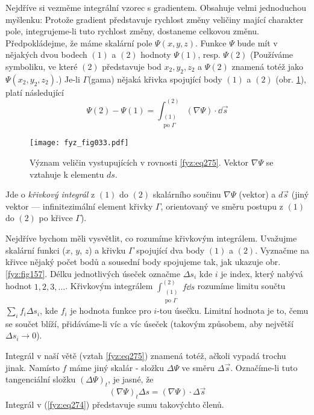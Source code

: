     Nejdříve si vezměme integrální vzorec s gradientem. Obsahuje velmi jednoduchou myšlenku: 
    Protože gradient představuje rychlost změny veličiny mající charakter pole, inte\-gru\-jeme-li 
    tuto rychlost změny, dostaneme celkovou změnu. Předpokládejme, že máme skalární pole \(\Psi(x, 
    y, z)\). Funkce \(\Psi\) bude mít v nějakých dvou bodech \((1)\) a \((2)\) hodnoty \(\Psi(1)\), 
    resp. \(\Psi(2)\) (Používáme symboliku, ve které \((2)\) představuje bod \(x_2, y_2, z_2\) a 
    \(\Psi(2)\) znamená totéž jako \(\Psi(x_2, y_2, z_2)\).) Je-li \(\Gamma\)(gama) nějaká 
    křivka spojující body \((1)\) a \((2)\) (obr. \ref{fyz:fig033}), platí následující
    \begin{equation}\label{fyz:eq275}
      \Psi(2)-\Psi(1) = \int_{\substack{(1)\\\text{po }\Gamma}}^{(2)}(\nabla\Psi)\cdot\dd{\vec{s}}
    \end{equation} 

    \begin{figure}[ht!]  %
      \centering
      \texttt{[image: fyz\_fig033.pdf]}
      \caption{Význam veličin vystupujících v rovnosti \ref{fyz:eq275}. Vektor 
               \(\nabla\Psi\) se vztahuje k elementu \(ds\).}
      \label{fyz:fig033}
    \end{figure}
    Jde o \emph{křivkový integrál} z \((1)\) do \((2)\) skalárního součinu \(\nabla\Psi\) (vektor) a
    \(d\vec{s}\) (jiný vektor — infinitezimální element křivky \(\Gamma\), orientovaný ve směru  
    postupu z \((1)\) do \((2)\) po křivce \(\Gamma\)).
    
    Nejdříve bychom měli vysvětlit, co rozumíme křivkovým integrálem. Uvažujme skalární funkci 
    (\(x\), \(y\), \(z\)) a křivku \(\Gamma\) spojující dva body \((1)\) a \((2)\). Vyznačme na 
    křivce nějaký počet bodů a sousední body spojujeme tak, jak ukazuje obr.  \ref{fyz:fig157}. 
    Délku jednotlivých úseček označme \(\Delta s_i\) kde \(i\) je index, který nabývá hodnot 
    \(1,2,3,\ldots\). Křivkovým integrálem \(\displaystyle\int_{\substack{(1)\\\text{po 
    }\Gamma}}^{(2)}f\dd{s}\) rozumíme limitu součtu \(\displaystyle\sum_i f_i\Delta s_i\), kde 
    \(f_i\) je hodnota funkce pro \(i\)-tou úsečku. Limitní hodnota je to, čemu se součet blíží, 
    přidáváme-li víc a víc úseček (takovým způsobem, aby největší \(\Delta s_i\rightarrow 0\)).
    
    Integrál v naší větě (vztah \ref{fyz:eq275}) znamená totéž, ačkoli vypadá trochu jinak. Namísto 
    \(f\) máme jiný skalár - složku \(\Delta\Psi\) ve směru \(\Delta\vec{s}\). Označíme-li tuto 
    tangenciální složku \((\Delta\Psi)_t\), je jasné, že
    \begin{equation}\label{fyz:eq274}
      (\nabla\Psi)_t\Delta s = (\nabla\Psi)\cdot\Delta\vec{s}
    \end{equation}
    Integrál v (\ref{fyz:eq274}) představuje sumu takovýchto členů.
    
